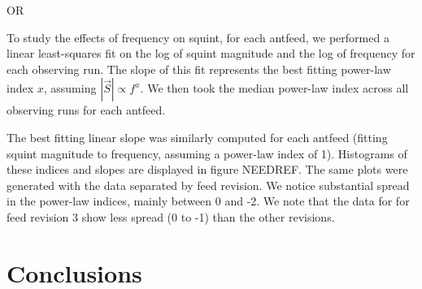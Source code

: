\documentclass[preprint]{aastex}
\begin{document}
OR

To study the effects of frequency on squint, for each antfeed, we
performed a linear least-squares fit on the log of squint magnitude
and the log of frequency for each observing run.  The slope of this
fit represents the best fitting power-law index $x$, assuming
$|\vec{S}| \propto f^x$.  We then took the median power-law index
across all observing runs for each antfeed.

The best fitting linear slope was similarly computed for each antfeed
(fitting squint magnitude to frequency, assuming a power-law index of
1).  Histograms of these indices and slopes are displayed in figure
NEEDREF.  The same plots were generated with the data separated by
feed revision.  We notice substantial spread in the power-law indices,
mainly between 0 and -2.  We note that the data for for feed revision
3 show less spread (0 to -1) than the other revisions.

\section{Conclusions}\label{s.conclusions}




\end{document}
